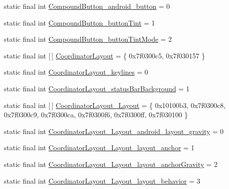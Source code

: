 \begin{DoxyCompactItemize}
\item 
static final int \mbox{\hyperlink{classcom_1_1synnapps_1_1carouselview_1_1_r_1_1styleable_a92869000ec039fd59a7b04f5609a2b25}{Compound\+Button\+\_\+android\+\_\+button}} = 0
\item 
static final int \mbox{\hyperlink{classcom_1_1synnapps_1_1carouselview_1_1_r_1_1styleable_a3f14cf795aa15075cacbd68469cd703c}{Compound\+Button\+\_\+button\+Tint}} = 1
\item 
static final int \mbox{\hyperlink{classcom_1_1synnapps_1_1carouselview_1_1_r_1_1styleable_a1037e0d163d9f216b5bc8a57dfddf400}{Compound\+Button\+\_\+button\+Tint\+Mode}} = 2
\item 
static final int \mbox{[}$\,$\mbox{]} \mbox{\hyperlink{classcom_1_1synnapps_1_1carouselview_1_1_r_1_1styleable_a0faf84457fb65f330c58651a12ad34d2}{Coordinator\+Layout}} = \{ 0x7f0300c5, 0x7f030157 \}
\item 
static final int \mbox{\hyperlink{classcom_1_1synnapps_1_1carouselview_1_1_r_1_1styleable_aa6357dd345bf362303e407b45ad6ae71}{Coordinator\+Layout\+\_\+keylines}} = 0
\item 
static final int \mbox{\hyperlink{classcom_1_1synnapps_1_1carouselview_1_1_r_1_1styleable_a6ce29b98acc13ee14c940bcdf42b1eff}{Coordinator\+Layout\+\_\+status\+Bar\+Background}} = 1
\item 
static final int \mbox{[}$\,$\mbox{]} \mbox{\hyperlink{classcom_1_1synnapps_1_1carouselview_1_1_r_1_1styleable_ab94653764a3e8e28e739d90f7b8bac3a}{Coordinator\+Layout\+\_\+\+Layout}} = \{ 0x10100b3, 0x7f0300c8, 0x7f0300c9, 0x7f0300ca, 0x7f0300f6, 0x7f0300ff, 0x7f030100 \}
\item 
static final int \mbox{\hyperlink{classcom_1_1synnapps_1_1carouselview_1_1_r_1_1styleable_a91c104bf4df052315cc4c2c12d20ed3b}{Coordinator\+Layout\+\_\+\+Layout\+\_\+android\+\_\+layout\+\_\+gravity}} = 0
\item 
static final int \mbox{\hyperlink{classcom_1_1synnapps_1_1carouselview_1_1_r_1_1styleable_a8fd32b4441b2c374f06ef49e18730dc8}{Coordinator\+Layout\+\_\+\+Layout\+\_\+layout\+\_\+anchor}} = 1
\item 
static final int \mbox{\hyperlink{classcom_1_1synnapps_1_1carouselview_1_1_r_1_1styleable_a6f83b36d5fa95ba413686bab94b23d34}{Coordinator\+Layout\+\_\+\+Layout\+\_\+layout\+\_\+anchor\+Gravity}} = 2
\item 
static final int \mbox{\hyperlink{classcom_1_1synnapps_1_1carouselview_1_1_r_1_1styleable_abb4b1a794cf0b1e60c4c3e7e34a10130}{Coordinator\+Layout\+\_\+\+Layout\+\_\+layout\+\_\+behavior}} = 3

\end{DoxyCompactItemize}

